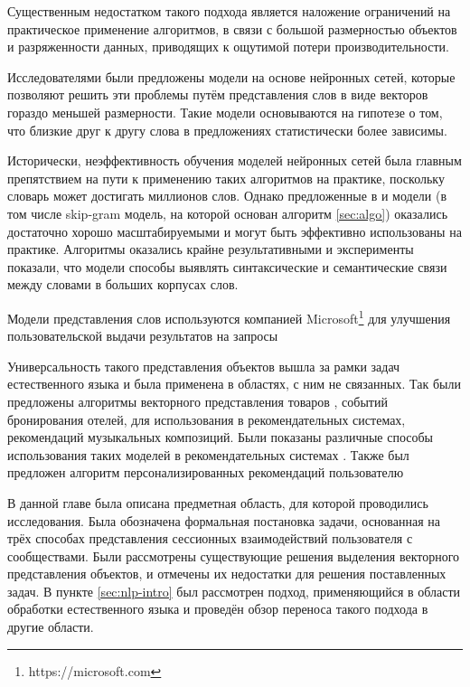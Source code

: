 \documentclass[times,specification,annotation]{itmo-student-thesis}
\begin{document}
Существенным недостатком такого подхода является наложение ограничений на практическое применение алгоритмов, в связи с большой размерностью объектов и разряженности данных, приводящих к ощутимой потери производительности.

Исследователями были предложены модели на основе нейронных сетей\cite{turian2010}, которые позволяют решить эти проблемы путём представления слов в виде векторов гораздо меньшей размерности. Такие модели основываются на гипотезе о том, что близкие друг к другу слова в предложениях статистически более зависимы.

Исторически, неэффективность обучения моделей нейронных сетей была главным препятствием на пути к применению таких алгоритмов на практике, поскольку словарь может достигать миллионов слов. Однако предложенные в \cite{mikolov2013efficient} и \cite{mikolov2013distributed} модели (в том числе skip-gram модель, на которой основан алгоритм \ref{sec:algo}) оказались достаточно хорошо масштабируемыми и могут быть эффективно использованы на практике. Алгоритмы оказались крайне результативными и эксперименты показали, что модели способы выявлять синтаксические и семантические связи между словами в больших корпусах слов. 

Модели представления слов используются компанией Microsoft\footnote{https://microsoft.com} для улучшения пользовательской выдачи результатов на запросы \cite{Nalisnick2016}

Универсальность такого представления объектов вышла за рамки задач естественного языка и была применена в областях, с ним не связанных. Так были предложены алгоритмы векторного представления товаров \cite{grbovic2015commerce}\cite{Vasile2016}, событий бронирования отелей\cite{airbnb}, для использования в рекомендательных системах, рекомендаций музыкальных композиций\cite{cheng2017exploiting}. Были показаны различные способы использования таких моделей в рекомендательных системах \cite{ozsoy2016word}. Также был предложен алгоритм персонализированных рекомендаций пользователю \cite{manotumruksa2016modelling}

\chapterconclusion

В данной главе была описана предметная область, для которой проводились исследования. Была обозначена формальная постановка задачи, основанная на трёх способах представления сессионных взаимодействий пользователя с сообществами. Были рассмотрены существующие решения выделения векторного представления объектов, и отмечены их недостатки для решения поставленных задач. В пункте \ref{sec:nlp-intro} был рассмотрен подход, применяющийся в области обработки естественного языка и проведён обзор переноса такого подхода в другие области.   
\end{document}

